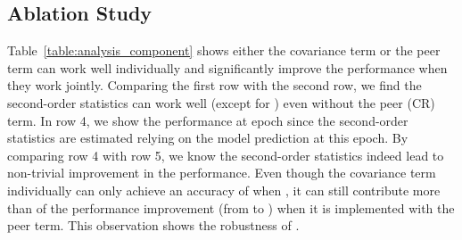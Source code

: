 \documentclass[final]{cvpr}
\newcommand{\covpeer}{\text{CAL}}
\begin{document}
\subsection{Ablation Study}

Table~\ref{table:analysis_component} shows either the covariance term or the peer term can work well individually and significantly improve the performance when they work jointly.
Comparing the first row with the second row, we find the second-order statistics can work well (except for ) even without the peer (CR) term. 
In row 4, we show the performance at epoch  since the second-order statistics are estimated relying on the model prediction at this epoch.
By comparing row 4 with row 5, we know the second-order statistics indeed lead to non-trivial improvement in the performance.
Even though the covariance term individually can only achieve an accuracy of  when , it can still contribute more than  of the performance improvement (from  to ) when it is implemented with the peer term.
This observation shows the robustness of \covpeer{}.
\end{document}
